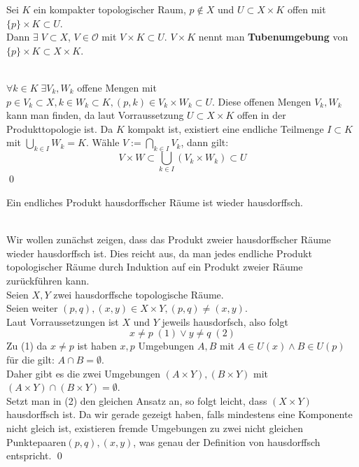 \begin{Lemma}[Tubenlemma]
	Sei \(K \) ein kompakter topologischer Raum,  \(p \notin X \) und \( U \subset X \times K \) offen mit \( \{p\} \times K \subset U \). \\
	Dann \( \exists \; V \subset X \), \( V \in \mathcal{O} \) mit \( V \times K \subset U \). \( V \times K \) nennt man { \bf Tubenumgebung } von 
	\( \{p\} \times K \subset X \times K \).
\end{Lemma} 
%
	\\
	\( \forall k \in K \; \exists V_{k}, W_{k}\) offene Mengen mit \( p \in V_{k} \subset X, k \in W_{k} \subset K, (p,k) \in  V_{k} \times W_{k} \subset U\).
	Diese offenen Mengen \(V_{k}, W_{k}\) kann man finden, da laut Vorraussetzung \(U  \subset X \times K \) offen in der Produkttopologie ist.
	Da \(K \) kompakt ist, existiert eine endliche Teilmenge
	\( I \subset K \) mit \( \bigcup_{ k \in I } W_{k} = K \). Wähle \(V := \bigcap_{ k \in I } V_{k} \), dann gilt:
	\[ V \times W \subset \bigcup_{k \in I} (V_{k} \times W_{k}) \subset U \] \qed	\\
%

%
\begin{Satz}
	Ein endliches Produkt hausdorffscher Räume ist wieder hausdorffsch.
\end{Satz}
%
	\\
	Wir wollen zunächst zeigen, dass das Produkt zweier hausdorffscher Räume wieder hausdorffsch ist. Dies reicht aus, da man jedes endliche Produkt topologischer Räume
	durch Induktion auf ein Produkt zweier Räume zurückführen kann. \\
	Seien \(X, Y\) zwei hausdorffsche topologische Räume.\\
	Seien weiter \( (p,q), (x,y) \in X \times Y, (p,q) \ne (x,y) \). \\
	Laut Vorraussetzungen ist \(X\) und \(Y\) jeweils hausdorfsch, also folgt 
	\[x \ne p \; (1) \lor y \ne q \; (2) \]
	Zu (1) da \(x \ne p \) ist haben \(x, p \) Umgebungen \(A, B \) mit \( A \in U(x)  \land B \in U(p) \) für die gilt: \(A \cap B = \emptyset \).\\ Daher gibt es die
	zwei Umgebungen \( (A \times Y), (B \times Y) \) mit \( (A \times Y) \cap (B \times Y) = \emptyset \). \\
	Setzt man in (2) den gleichen Ansatz an, so folgt leicht, dass \( (X \times Y) \) hausdorffsch ist. Da wir gerade gezeigt haben, falls mindestens eine Komponente
	nicht gleich ist,	existieren fremde Umgebungen zu zwei nicht gleichen Punktepaaren\( (p,q), (x,y) \), was genau der Definition von hausdorffsch entspricht.
\qed

